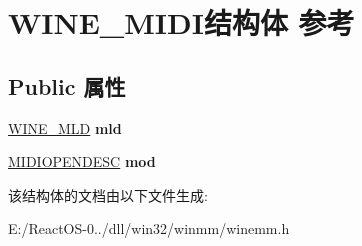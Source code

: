 \hypertarget{struct_w_i_n_e___m_i_d_i}{}\section{W\+I\+N\+E\+\_\+\+M\+I\+D\+I结构体 参考}
\label{struct_w_i_n_e___m_i_d_i}
\subsection*{Public 属性}
\begin{DoxyCompactItemize}
\item 
\mbox{\label{struct_w_i_n_e___m_i_d_i_a1057c71b00da288fa0712c16ca643509}} 
\hyperlink{structtag_w_i_n_e___m_l_d}{W\+I\+N\+E\+\_\+\+M\+LD} {\bfseries mld}
\item 
\mbox{\label{struct_w_i_n_e___m_i_d_i_afa5a1cca92b43388fc226b706924547d}} 
\hyperlink{struct_m_i_d_i_o_p_e_n_d_e_s_c}{M\+I\+D\+I\+O\+P\+E\+N\+D\+E\+SC} {\bfseries mod}
\end{DoxyCompactItemize}


该结构体的文档由以下文件生成\+:\begin{DoxyCompactItemize}
\item 
E\+:/\+React\+O\+S-\/0../dll/win32/winmm/winemm.\+h\end{DoxyCompactItemize}
